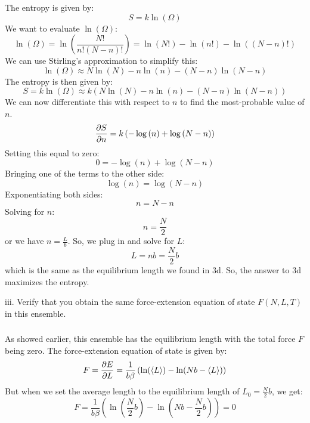 \documentclass[12pt]{article}
\begin{document}
\subsubsection{}
The entropy is given by:
\begin{equation}
  S = k \ln(\Omega)
\end{equation}
We want to evaluate $\ln(\Omega)$:
\begin{equation}
  \ln(\Omega) = \ln\left(\frac{N!}{n!(N-n)!}\right) = \ln(N!) - \ln(n!) - \ln((N-n)!)
\end{equation}
We can use Stirling's approximation to simplify this:
\begin{equation}
  \ln(\Omega) \approx N \ln(N) - n \ln(n) - (N-n) \ln(N-n)
\end{equation}
The entropy is then given by:
\begin{equation}
  S = k \ln(\Omega) \approx k \left( N \ln(N) - n \ln(n) - (N-n) \ln(N-n) \right)
\end{equation}
We can now differentiate this with respect to $n$ to find the most-probable value of $n$.
\begin{equation}
  \pdv{S}{n} = k \left(- \log{\left(n \right)} + \log{\left(N - n \right)}\right)
\end{equation}
Setting this equal to zero:
\begin{equation}
  0 = - \log{\left(n \right)} + \log{\left(N - n \right)}
\end{equation}
Bringing one of the terms to the other side:
\begin{equation}
  \log{\left(n \right)} = \log{\left(N - n \right)}
\end{equation}
Exponentiating both sides:
\begin{equation}
  n = N - n
\end{equation}
Solving for $n$:
\begin{equation}
  n = \frac{N}{2}
\end{equation}
or we have $n = \frac{L}{b}$. So, we plug in and solve for $L$:
\begin{equation}
  L = n b = \frac{N}{2} b
\end{equation}
which is the same as the equilibrium length we found in 3d. So, the answer to 3d maximizes the entropy.

iii. Verify that you obtain the same force-extension equation of state $F(N, L, T)$ in this ensemble.
\subsubsection{}
As showed earlier, this ensemble has the equilibrium length with the total force $F$ being zero. The force-extension equation of state is given by:
\begin{equation}
  F = \pdv{E}{L} = \frac{1}{b\beta }\left( \ln (\langle L \rangle) - \ln (N b - \langle L \rangle) \right)
\end{equation}
But when we set the average length to the equilibrium length of $L_0 = \frac{N}{2} b$, we get:
\begin{equation}
  F = \frac{1}{b\beta }\left( \ln (\frac{N}{2} b) - \ln (Nb - \frac{N}{2} b) \right) = 0
\end{equation}
\end{document}

